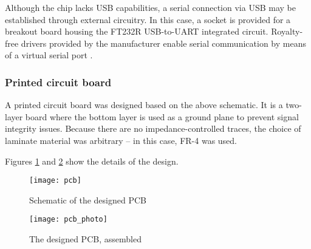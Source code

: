 Although the chip lacks USB capabilities, a serial connection via USB may
be established through external circuitry. In this case, a socket is provided
for a breakout board housing the FT232R USB-to-UART integrated circuit.
Royalty-free drivers provided by the manufacturer enable serial communication
by means of a virtual serial port \cite{ft232}.

\subsubsection{Printed circuit board}
\label{pcbsection}

A printed circuit board was designed based on the above schematic. It is a
two-layer board where the bottom layer is used as a ground plane to prevent
signal integrity issues. Because there are no impedance-controlled traces, the
choice of laminate material was arbitrary -- in this case, FR-4 was used.

Figures \ref{pcb} and \ref{pcb_photo} show the details
of the design.

\begin{figure}[ht]
    \begin{center}
        \texttt{[image: pcb]}
        \caption{Schematic of the designed PCB}
        \label{pcb}
    \end{center}
\end{figure}
\begin{figure}[ht]
    \begin{center}
        \texttt{[image: pcb\_photo]}
        \caption{The designed PCB, assembled}
        \label{pcb_photo}
    \end{center}
\end{figure}
\clearpage
